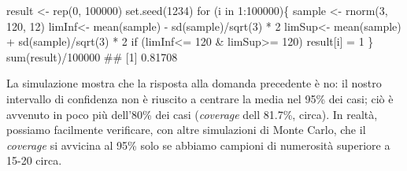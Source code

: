 \documentclass[a4paper,12pt,oneside]{book}
\newenvironment{Shaded}{\begin{snugshade}}{\end{snugshade}}
\newcommand{\DecValTok}[1]{#1}
\newcommand{\SpecialCharTok}[1]{#1}
\newcommand{\DocumentationTok}[1]{#1}
\newcommand{\OtherTok}[1]{#1}
\newcommand{\FunctionTok}[1]{#1}
\newcommand{\ControlFlowTok}[1]{#1}
\newcommand{\NormalTok}[1]{#1}
\begin{document}
\begin{Shaded}
\begin{Highlighting}[]
\NormalTok{result }\OtherTok{\textless{}{-}} \FunctionTok{rep}\NormalTok{(}\DecValTok{0}\NormalTok{, }\DecValTok{100000}\NormalTok{)}
\FunctionTok{set.seed}\NormalTok{(}\DecValTok{1234}\NormalTok{)}
\ControlFlowTok{for}\NormalTok{ (i }\ControlFlowTok{in} \DecValTok{1}\SpecialCharTok{:}\DecValTok{100000}\NormalTok{)\{}
\NormalTok{  sample }\OtherTok{\textless{}{-}} \FunctionTok{rnorm}\NormalTok{(}\DecValTok{3}\NormalTok{, }\DecValTok{120}\NormalTok{, }\DecValTok{12}\NormalTok{)}
\NormalTok{  limInf}\OtherTok{\textless{}{-}} \FunctionTok{mean}\NormalTok{(sample) }\SpecialCharTok{{-}} \FunctionTok{sd}\NormalTok{(sample)}\SpecialCharTok{/}\FunctionTok{sqrt}\NormalTok{(}\DecValTok{3}\NormalTok{) }\SpecialCharTok{*} \DecValTok{2} 
\NormalTok{  limSup}\OtherTok{\textless{}{-}} \FunctionTok{mean}\NormalTok{(sample) }\SpecialCharTok{+} \FunctionTok{sd}\NormalTok{(sample)}\SpecialCharTok{/}\FunctionTok{sqrt}\NormalTok{(}\DecValTok{3}\NormalTok{) }\SpecialCharTok{*} \DecValTok{2}
  \ControlFlowTok{if}\NormalTok{ (limInf}\SpecialCharTok{\textless{}=} \DecValTok{120} \SpecialCharTok{\&}\NormalTok{ limSup}\SpecialCharTok{\textgreater{}=} \DecValTok{120}\NormalTok{) result[i] }\OtherTok{=} \DecValTok{1}
\NormalTok{\}}
\FunctionTok{sum}\NormalTok{(result)}\SpecialCharTok{/}\DecValTok{100000}
\DocumentationTok{\#\# [1] 0.81708}
\end{Highlighting}
\end{Shaded}

La simulazione mostra che la risposta alla domanda precedente è no: il nostro intervallo di confidenza non è riuscito a centrare la media nel 95\% dei casi; ciò è avvenuto in poco più dell'80\% dei casi (\emph{coverage} dell 81.7\%, circa). In realtà, possiamo facilmente verificare, con altre simulazioni di Monte Carlo, che il \emph{coverage} si avvicina al 95\% solo se abbiamo campioni di numerosità superiore a 15-20 circa.
\end{document}
